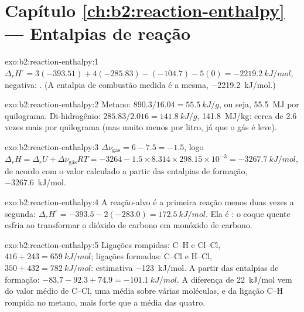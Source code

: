 \section*{Capítulo \ref{ch:b2:reaction-enthalpy} --- Entalpias de reação}

\begin{solution}{exo:b2:reaction-enthalpy:1}
$\Delta_r H^\circ = 3(-393.51) + 4(-285.83) - (-104.7) - 5(0) =
\qty{-2219.2}{kJ/mol}$, negativa: . (A entalpia de combustão
medida é a mesma, \qty{-2219.2}{kJ/mol}.)
\end{solution}

\begin{solution}{exo:b2:reaction-enthalpy:2}
Metano: $890.3/16.04 = \qty{55.5}{kJ/g}$, ou seja, \qty{55.5}{MJ} por
quilograma. Di-hidrogênio: $285.83/2.016 = \qty{141.8}{kJ/g}$,
\qty{141.8}{MJ/kg}: cerca de 2.6 vezes mais por quilograma (mas muito menos
por litro, já que o gás é leve).
\end{solution}

\begin{solution}{exo:b2:reaction-enthalpy:3}
$\Delta\nu_{\text{gás}} = 6 - 7.5 = -1.5$, logo $\Delta_r H = \Delta_r U +
\Delta\nu_{\text{gás}}RT = -3264 - 1.5 \times 8.314 \times 298.15 \times
10^{-3} = \qty{-3267.7}{kJ/mol}$, de acordo com o valor calculado a partir
das entalpias de formação, \qty{-3267.6}{kJ/mol}.
\end{solution}

\begin{solution}{exo:b2:reaction-enthalpy:4}
A reação-alvo é a primeira reação menos duas vezes a segunda:
$\Delta_r H^\circ = -393.5 - 2(-283.0) = \qty{+172.5}{kJ/mol}$. Ela é
: o coque quente esfria ao transformar o dióxido de carbono em
monóxido de carbono.
\end{solution}

\begin{solution}{exo:b2:reaction-enthalpy:5}
Ligações rompidas: C--H e Cl--Cl, $416 + 243 = \qty{659}{kJ/mol}$; ligações
formadas: C--Cl e H--Cl, $350 + 432 = \qty{782}{kJ/mol}$: estimativa
\qty{-123}{kJ/mol}. A partir das entalpias de formação: $-83.7 - 92.3 + 74.9 =
\qty{-101.1}{kJ/mol}$. A diferença de \qty{22}{kJ/mol} vem do valor médio
de C--Cl, uma média sobre várias moléculas, e da ligação C--H rompida no
metano, mais forte que a média das quatro.
\end{solution}

